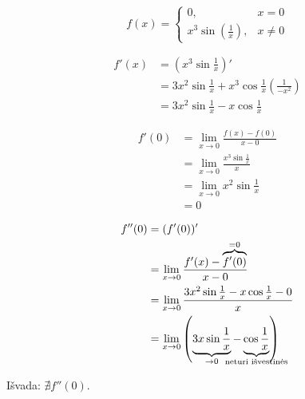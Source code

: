 \begin{exmp}
  \begin{equation*}
    f(x) = 
    \begin{cases}
      0, & x = 0 \\
      x^{3} \sin \left( \frac{1}{x} \right), & x \neq 0
    \end{cases}
  \end{equation*}

  \begin{align*}
    f'(x) 
    &= \left( x^{3} \sin \frac{1}{x} \right)' \\
    &= 3 x^{2} \sin \frac{1}{x} +   
      x^{3} \cos \frac{1}{x} \left( \frac{1}{-x^{2}} \right) \\
    &= 3 x^{2} \sin \frac{1}{x} - x \cos \frac{1}{x}
  \end{align*}

  \begin{align*}
    f'(0)
    &= \lim _{x \to 0} \frac{f(x) - f(0)}{x - 0} \\
    &= \lim _{x \to 0} \frac{x^{3} \sin \frac{1}{x}}{x} \\
    &= \lim _{x \to 0} x^{2} \sin \frac{1}{x} \\
    &= 0
  \end{align*}

  \begin{align*}
    f''(0)
    &= (f'(0))' \\
    &= \lim _{x \to 0} \frac{f'(x) - \overbrace{f'(0)}^{= 0}}{x - 0} \\
    &= \lim _{x \to 0} 
      \frac{3 x^{2} \sin \frac{1}{x} - x \cos \frac{1}{x} - 0}{x} \\
    &= \lim _{x \to 0} 
      \left( 
        \underbrace{3 x \sin \frac{1}{x}}_{\to 0} - 
        \underbrace{\cos \frac{1}{x}}_{\mathclap{\text{neturi išvestinės}}} 
      \right)
  \end{align*}

  Išvada: $\nexists f''(0)$.
\end{exmp}
